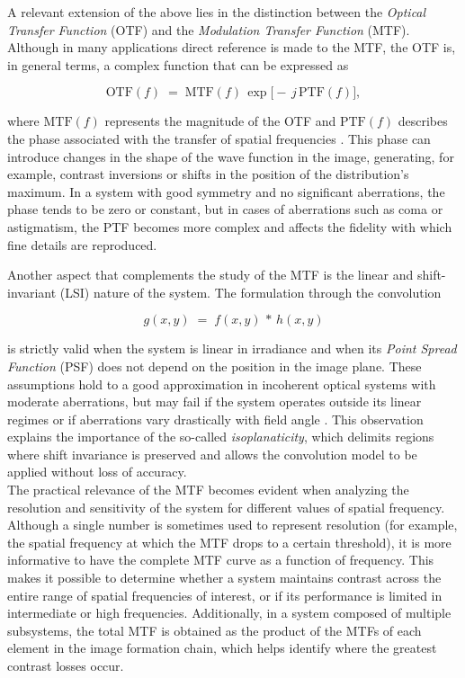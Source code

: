 A relevant extension of the above lies in the distinction between the \textit{Optical Transfer Function} (OTF) and the \textit{Modulation Transfer Function} (MTF). Although in many applications direct reference is made to the MTF, the OTF is, in general terms, a complex function that can be expressed as

\begin{equation}
\text{OTF}(f) \;=\; \text{MTF}(f)\,\exp\bigl[-\,j\,\text{PTF}(f)\bigr],
\end{equation}

where $\text{MTF}(f)$ represents the magnitude of the OTF and $\text{PTF}(f)$ describes the phase associated with the transfer of spatial frequencies \cite{Boreman2001ModulationTT52}. This phase can introduce changes in the shape of the wave function in the image, generating, for example, contrast inversions or shifts in the position of the distribution’s maximum. In a system with good symmetry and no significant aberrations, the phase tends to be zero or constant, but in cases of aberrations such as coma or astigmatism, the PTF becomes more complex and affects the fidelity with which fine details are reproduced.

Another aspect that complements the study of the MTF is the linear and shift-invariant (LSI) nature of the system. The formulation through the convolution

\begin{equation}
g(x,y)\;=\;f(x,y)\,*\,h(x,y)
\end{equation}

is strictly valid when the system is linear in irradiance and when its \textit{Point Spread Function} (PSF) does not depend on the position in the image plane. These assumptions hold to a good approximation in incoherent optical systems with moderate aberrations, but may fail if the system operates outside its linear regimes or if aberrations vary drastically with field angle \cite{Boreman2001ModulationTT52}. This observation explains the importance of the so-called \textit{isoplanaticity}, which delimits regions where shift invariance is preserved and allows the convolution model to be applied without loss of accuracy.\\

The practical relevance of the MTF becomes evident when analyzing the resolution and sensitivity of the system for different values of spatial frequency. Although a single number is sometimes used to represent resolution (for example, the spatial frequency at which the MTF drops to a certain threshold), it is more informative to have the complete MTF curve as a function of frequency. This makes it possible to determine whether a system maintains contrast across the entire range of spatial frequencies of interest, or if its performance is limited in intermediate or high frequencies. Additionally, in a system composed of multiple subsystems, the total MTF is obtained as the product of the MTFs of each element in the image formation chain, which helps identify where the greatest contrast losses occur.\\

